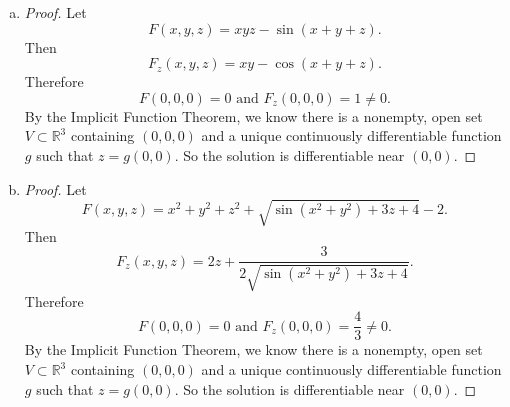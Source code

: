 \begin{Exercise}
\begin{enumerate}[a)]
\item
\begin{proof}
Let
$$
F(x,y,z) = x y z-\sin(x+y+z).
$$
Then
$$
F_z(x,y,z) = x y - \cos(x+y+z).
$$
Therefore
$$
F(0,0,0) = 0\text{ and }F_z(0,0,0) = 1 \neq 0.
$$
By the Implicit Function Theorem, we know there is a nonempty, open set $V\subset\mathbb{R}^3$ containing $(0,0,0)$ and a unique continuously differentiable function
$g$ such that $z = g(0,0)$. So the solution is differentiable near $(0,0)$.
\end{proof}

\item
\begin{proof}
Let
$$
F(x,y,z) = x^2+y^2+z^2+\sqrt{\sin(x^2+y^2)+3z+4}-2.
$$
Then
$$
F_z(x,y,z) = 2z+\frac{3}{2\sqrt{\sin(x^2+y^2)+3z+4}}.
$$
Therefore
$$
F(0,0,0) = 0\text{ and }F_z(0,0,0) = \frac{4}{3} \neq 0.
$$
By the Implicit Function Theorem, we know there is a nonempty, open set $V\subset\mathbb{R}^3$ containing $(0,0,0)$ and a unique continuously differentiable function
$g$ such that $z = g(0,0)$. So the solution is differentiable near $(0,0)$.
\end{proof}
\end{enumerate}
\end{Exercise}
